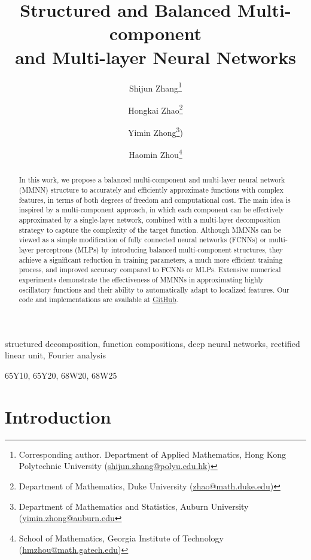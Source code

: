 \documentclass[review,hidelinks,onefignum,onetabnum]{siamart250211}
\title{Structured and Balanced Multi-component\\ 
and Multi-layer Neural Networks
}
\author{Shijun Zhang\thanks{Corresponding author. Department of Applied Mathematics, Hong Kong Polytechnic University  (\href{mailto:shijun.zhang@polyu.edu.hk}{shijun.zhang@polyu.edu.hk})
}
\and Hongkai Zhao\thanks{Department of Mathematics, Duke University (\href{mailto:zhao@math.duke.edu}{zhao@math.duke.edu})}
\and Yimin Zhong\thanks{Department of Mathematics and Statistics, Auburn University (\href{mailto:yimin.zhong@auburn.edu}{yimin.zhong@auburn.edu}})
\and Haomin Zhou\thanks{School of Mathematics,
 Georgia Institute of Technology (\href{mailto:hmzhou@math.gatech.edu}{hmzhou@math.gatech.edu})}
 }
\begin{document}
\maketitle

\begin{abstract}
    In this work, we propose a balanced multi-component and multi-layer neural network (MMNN) structure to accurately and efficiently approximate functions with complex features, in terms of both degrees of freedom and computational cost. The main idea is inspired by a multi-component approach, in which each component can be effectively approximated by a single-layer network, combined with a multi-layer decomposition strategy to capture the complexity of the target function. Although MMNNs can be viewed as a simple modification of fully connected neural networks (FCNNs) or multi-layer perceptrons (MLPs) by introducing balanced multi-component structures, they achieve a significant reduction in training parameters, a much more efficient training process, and improved accuracy compared to FCNNs or MLPs. Extensive numerical experiments demonstrate the effectiveness of MMNNs in approximating highly oscillatory functions and their ability to automatically adapt to localized features.
    Our code and implementations are available at \href{https://github.com/ShijunZhangMath/MMNN/}{GitHub}.
\end{abstract}

\begin{keywords}
structured decomposition, function compositions, 
        deep neural networks,
        rectified linear unit, Fourier analysis
\end{keywords}

\begin{MSCcodes}
65Y10, 65Y20, 68W20, 68W25
\end{MSCcodes}



\section{Introduction}
\label{sec:intro}
\end{document}
